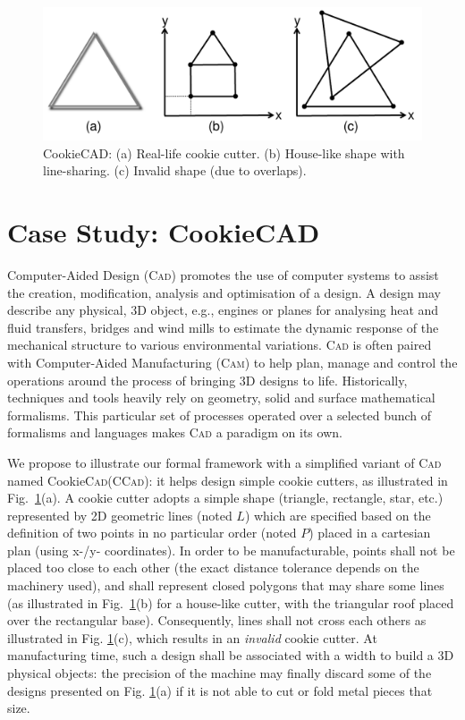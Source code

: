 \begin{figure}[t]
   \centering
   \includegraphics[width=\columnwidth]{CookieCAD.pdf}
   \caption{CookieCAD: (a) Real-life cookie cutter. (b) House-like 
shape with line-sharing. (c) Invalid shape (due to overlaps).}%
 
   \label{fig:CookieCAD}
\end{figure}

\section{Case Study: CookieCAD}
\label{sec:CS}

Computer-Aided Design (\textsc{Cad}) \cite{B:Groover-Zimmers:2008} promotes the
use of computer systems to assist the creation, modification, analysis and
optimisation of a design.
A design may describe any physical, 3D object, e.g., engines or planes for
analysing heat and fluid transfers, bridges and wind mills to estimate the
dynamic response of the mechanical structure to various environmental
variations. \textsc{Cad} is often paired with Computer-Aided Manufacturing
(\textsc{Cam}) to help plan, manage and control the operations around the
process of bringing 3D designs to life. Historically, techniques and tools
heavily rely on geometry, solid and surface mathematical formalisms. This
particular set of processes operated over a selected bunch of formalisms and
languages makes \textsc{Cad} a paradigm on its own.

We propose to illustrate our formal framework with a simplified variant of 
\textsc{Cad} named Cookie\textsc{Cad}(\textsc{CCad}): it helps design simple 
cookie cutters, as illustrated in Fig.~\ref{fig:CookieCAD}(a). A cookie cutter 
adopts a simple shape (triangle, rectangle, star, etc.) represented by 2D geometric 
lines (noted $L$) which are specified based on the definition of two points in 
no particular order (noted $P$) placed in a cartesian plan (using x-/y- 
coordinates). In order to be manufacturable, points shall not be placed too 
close to each other (the exact distance tolerance depends on the machinery 
used), and shall represent closed polygons that may share some lines (as 
illustrated in Fig.~\ref{fig:CookieCAD}(b) for a house-like cutter, with the 
triangular roof placed over the rectangular base). Consequently, lines shall not 
cross each others as illustrated in Fig. \ref{fig:CookieCAD}(c), which results 
in an \emph{invalid} cookie cutter. At manufacturing time, such a design shall 
be associated with a width to build a 3D physical objects: the precision of the 
machine may finally discard some of the designs presented on Fig. 
\ref{fig:CookieCAD}(a) if it is not able to cut or fold metal pieces that size.

